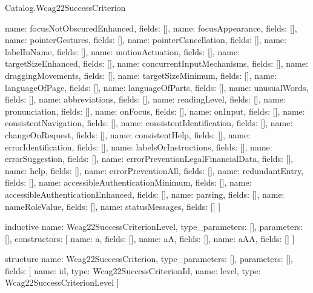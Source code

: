 \begin{lexlean}{Catalog.Wcag22SuccessCriterion}
\begin{semanticmodule}
{    {name: focusNotObscuredEnhanced, fields: []},
    {name: focusAppearance, fields: []},
    {name: pointerGestures, fields: []},
    {name: pointerCancellation, fields: []},
    {name: labelInName, fields: []},
    {name: motionActuation, fields: []},
    {name: targetSizeEnhanced, fields: []},
    {name: concurrentInputMechanisms, fields: []},
    {name: draggingMovements, fields: []},
    {name: targetSizeMinimum, fields: []},
    {name: languageOfPage, fields: []},
    {name: languageOfParts, fields: []},
    {name: unusualWords, fields: []},
    {name: abbreviations, fields: []},
    {name: readingLevel, fields: []},
    {name: pronunciation, fields: []},
    {name: onFocus, fields: []},
    {name: onInput, fields: []},
    {name: consistentNavigation, fields: []},
    {name: consistentIdentification, fields: []},
    {name: changeOnRequest, fields: []},
    {name: consistentHelp, fields: []},
    {name: errorIdentification, fields: []},
    {name: labelsOrInstructions, fields: []},
    {name: errorSuggestion, fields: []},
    {name: errorPreventionLegalFinancialData, fields: []},
    {name: help, fields: []},
    {name: errorPreventionAll, fields: []},
    {name: redundantEntry, fields: []},
    {name: accessibleAuthenticationMinimum, fields: []},
    {name: accessibleAuthenticationEnhanced, fields: []},
    {name: parsing, fields: []},
    {name: nameRoleValue, fields: []},
    {name: statusMessages, fields: []}
  ]
}

inductive{
  name: Wcag22SuccessCriterionLevel,
  type_parameters: [],
  parameters: [],
  constructors: [
    {name: a, fields: []},
    {name: aA, fields: []},
    {name: aAA, fields: []}
  ]
}

structure{
  name: Wcag22SuccessCriterion,
  type_parameters: [],
  parameters: [],
  fields: [
    {name: id, type: Wcag22SuccessCriterionId},
    {name: level, type: Wcag22SuccessCriterionLevel}
  ]
}
\end{semanticmodule}
\end{lexlean}
